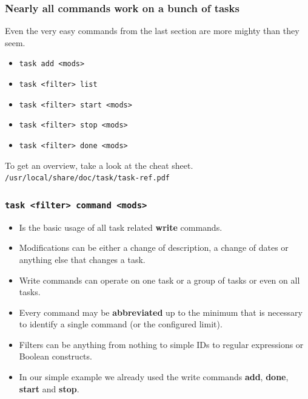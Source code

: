 \documentclass[t,handout,aspectratio=169]{beamer}
\begin{document}
\begin{frame}[fragile]\frametitle{Nearly all commands work on a bunch of tasks}
    \vfill
    Even the very easy commands from the last section are more mighty than they seem. \pause

    \begin{itemize}
        \item \verb+task add <mods>+
        \item \verb+task <filter> list+
        \item \verb+task <filter> start <mods>+
        \item \verb+task <filter> stop <mods>+
        \item \verb+task <filter> done <mods>+
    \end{itemize}

    To get an overview, take a look at the cheat sheet. \\
    \verb+/usr/local/share/doc/task/task-ref.pdf+
\end{frame}

\begin{frame}[fragile]\frametitle{\texttt{task <filter> command <mods>}}
    \vfill
    \begin{itemize}
        \item Is the basic usage of all task related \textbf{write} commands. \pause
        \item Modifications can be either a change of description, a change of dates or anything else that changes a task. \pause
        \item Write commands can operate on one task or a group of tasks or even on all tasks. \pause
        \item Every command may be \textbf{abbreviated} up to the minimum that is necessary to identify a single command (or the configured limit). \pause
        \item Filters can be anything from nothing to simple IDs to regular expressions or Boolean constructs. \pause
        \item In our simple example we already used the write commands \textbf{add}, \textbf{done}, \textbf{start} and \textbf{stop}.
    \end{itemize}
\end{frame}
\end{document}
